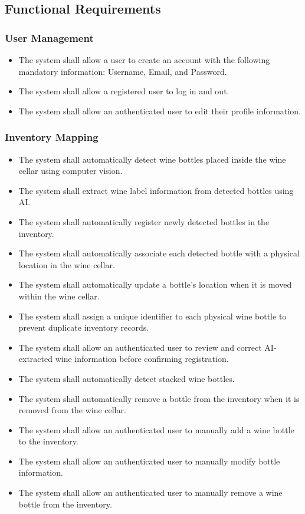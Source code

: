 \documentclass[conference]{IEEEtran}
\begin{document}
\subsection{Functional Requirements}

\subsubsection{User Management}
\begin{itemize}
    \item The system shall allow a user to create an account with the following mandatory information: Username, Email, and Password.
    \item The system shall allow a registered user to log in and out.
    \item The system shall allow an authenticated user to edit their profile information.
\end{itemize}

\subsubsection{Inventory Mapping}
\begin{itemize}
    \item The system shall automatically detect wine bottles placed inside the wine cellar using computer vision.
    \item The system shall extract wine label information from detected bottles using AI.
    \item The system shall automatically register newly detected bottles in the inventory.
    \item The system shall automatically associate each detected bottle with a physical location in the wine cellar.
    \item The system shall automatically update a bottle's location when it is moved within the wine cellar.
    \item The system shall assign a unique identifier to each physical wine bottle to prevent duplicate inventory records.
    \item The system shall allow an authenticated user to review and correct AI-extracted wine information before confirming registration.
    \item The system shall automatically detect stacked wine bottles.
    \item The system shall automatically remove a bottle from the inventory when it is removed from the wine cellar.
    \item The system shall allow an authenticated user to manually add a wine bottle to the inventory.
    \item The system shall allow an authenticated user to manually modify bottle information.
    \item The system shall allow an authenticated user to manually remove a wine bottle from the inventory.
\end{itemize}
\end{document}
